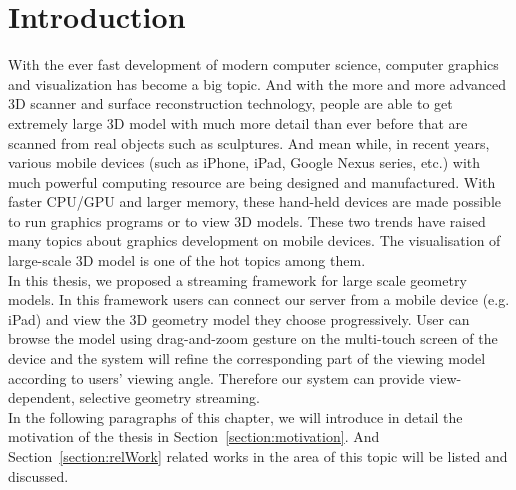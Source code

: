 \chapter{Introduction}
\label{chapter:introduction}

With the ever fast development of modern computer science, computer graphics and visualization has become a big topic. And with the more and more advanced 3D scanner and surface reconstruction technology, people are able to get extremely large 3D model with much more detail than ever before that are scanned from real objects such as sculptures. 
And mean while, in recent years, various mobile devices (such as iPhone, iPad, Google Nexus series, etc.) with much powerful computing resource are being designed and manufactured. With faster CPU/GPU and larger memory, these hand-held devices are made possible to run graphics programs or to view 3D models. These two trends have raised many topics about graphics development on mobile devices. The visualisation of large-scale 3D model is one of the hot topics among them. \\

In this thesis, we proposed a streaming framework for large scale geometry models. In this framework users can connect our server from a mobile device (e.g. iPad) and view the 3D geometry model they choose progressively. User can browse the model using drag-and-zoom gesture on the multi-touch screen of the device and the system will refine the corresponding part of the viewing model according to users' viewing angle. Therefore our system can provide view-dependent, selective geometry streaming. \\

In the following paragraphs of this chapter, we will introduce in detail the motivation of the thesis in Section~\ref{section:motivation}. And Section~\ref{section:relWork} related works in the area of this topic will be listed and discussed. \\

